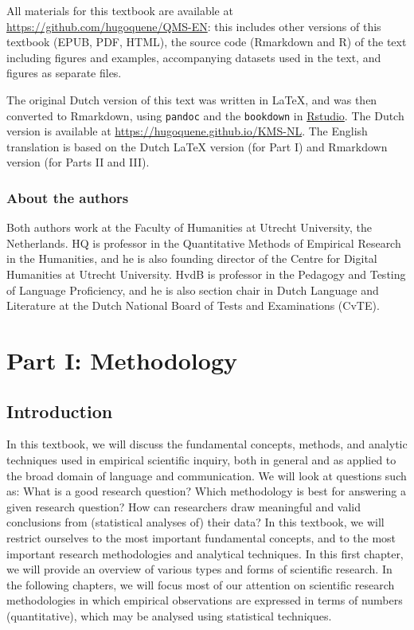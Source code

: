 \documentclass[
]{book}
\begin{document}
All materials for this textbook are available at
\url{https://github.com/hugoquene/QMS-EN}:
this includes other versions of this textbook (EPUB, PDF, HTML), the source code (Rmarkdown and R) of the text including figures and examples, accompanying datasets used in the text, and figures as separate files.

The original Dutch version of this text was written in LaTeX, and was then converted to Rmarkdown, using \texttt{pandoc} \citep{pandoc} and the \texttt{bookdown} \citep{R-bookdown} in \href{https://www.rstudio.com}{Rstudio}. The Dutch version is available at \url{https://hugoquene.github.io/KMS-NL}.
The English translation is based on the Dutch LaTeX version (for Part I) and Rmarkdown version (for Parts II and III).

\hypertarget{about-the-authors}{%
\section*{About the authors}\label{about-the-authors}}

Both authors work at the Faculty of Humanities at Utrecht University, the Netherlands.
HQ is professor in the Quantitative Methods of Empirical Research in the Humanities, and he is also founding director of the Centre for Digital Humanities at Utrecht University. HvdB is professor in the Pedagogy and Testing of Language Proficiency, and he is also section chair in Dutch Language and Literature at the Dutch National Board of Tests and Examinations (CvTE).

\hypertarget{part-part-i-methodology}{%
\part*{Part I: Methodology}\label{part-part-i-methodology}}

\hypertarget{ch:introduction}{%
\chapter{Introduction}\label{ch:introduction}}

In this textbook, we will discuss the fundamental concepts, methods, and analytic techniques used in empirical scientific inquiry, both in general and as applied to the broad domain of language and communication. We will look at questions such as: What is a good research question? Which methodology is best for answering a given research question? How can researchers draw meaningful and valid conclusions from (statistical analyses of) their data? In this textbook, we will restrict ourselves to the most important fundamental concepts, and to the most important research methodologies and analytical techniques. In this first chapter, we will provide an overview of various types and forms of scientific research. In the following chapters, we will focus most of our attention on scientific research methodologies in which empirical observations are expressed in terms of numbers (quantitative), which may be analysed using statistical techniques.
\end{document}
